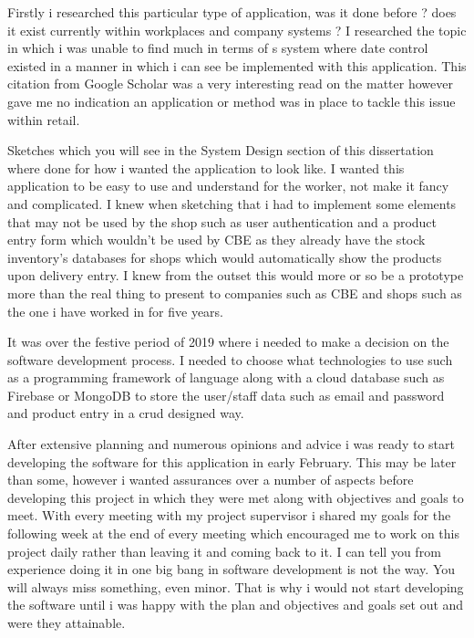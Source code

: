Firstly i researched this particular type of application, was it done before ? does it exist currently within workplaces and company systems ? I researched the topic in which i was unable to find much in terms of s system where date control existed in a manner in which i can see be implemented with this application. This citation from Google Scholar \cite{nakano2006food} was a very interesting read on the matter however gave me no indication an application or method was in place to tackle this issue within retail. 
\newline

Sketches which you will see in the System Design section of this dissertation where done for how i wanted the application to look like. I wanted this application to be easy to use and understand for the worker, not make it fancy and complicated. I knew when sketching that i had to implement some elements that may not be used by the shop such as user authentication and a product entry form which wouldn't be used by CBE as they already have the stock inventory's databases for shops which would automatically show the products upon delivery entry. I knew from the outset this would more or so be a prototype more than the real thing to present to companies such as CBE and shops such as the one i have worked in for five years. 
\newline

It was over the festive period of 2019 where i needed to make a decision on the software development process. I needed to choose what technologies to use such as a programming framework of language along with a cloud database such as Firebase or MongoDB to store the user/staff data such as email and password and product entry in a crud designed way.
\newline

After extensive planning and numerous opinions and advice i was ready to start developing the software for this application in early February. This may be later than some, however i wanted assurances over a number of aspects before developing this project in which they were met along with objectives and goals to meet. With every meeting with my project supervisor i shared my goals for the following week at the end of every meeting which encouraged me to work on this project daily rather than leaving it and coming back to it. I can tell you from experience doing it in one big bang in software development is not the way. You will always miss something, even minor. That is why i would not start developing the software until i was happy with the plan and objectives and goals set out and were they attainable.

